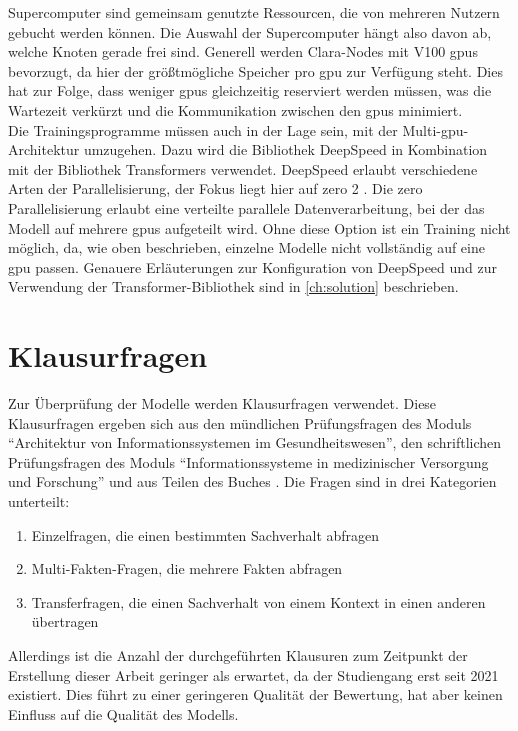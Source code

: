Supercomputer sind gemeinsam genutzte Ressourcen, die von mehreren Nutzern gebucht werden können.
Die Auswahl der Supercomputer hängt also davon ab, welche Knoten gerade frei sind.
Generell werden Clara-Nodes mit V100 \ac{gpu}s bevorzugt, da hier der größtmögliche Speicher pro \ac{gpu} zur Verfügung steht.
Dies hat zur Folge, dass weniger \ac{gpu}s gleichzeitig reserviert werden müssen, was die Wartezeit verkürzt und die Kommunikation zwischen den \ac{gpu}s minimiert.\\

Die Trainingsprogramme müssen auch in der Lage sein, mit der Multi-\ac{gpu}-Architektur umzugehen.
Dazu wird die Bibliothek DeepSpeed \citep{deepspeed} in Kombination mit der Bibliothek Transformers verwendet.
DeepSpeed erlaubt verschiedene Arten der Parallelisierung, der Fokus liegt hier auf \ac{zero} 2 \citep{deepspeed}.
Die \ac{zero} Parallelisierung erlaubt eine verteilte parallele Datenverarbeitung, bei der das Modell auf mehrere \ac{gpu}s aufgeteilt wird.
Ohne diese Option ist ein Training nicht möglich, da, wie oben beschrieben, einzelne Modelle nicht vollständig auf eine \ac{gpu} passen.
Genauere Erläuterungen zur Konfiguration von DeepSpeed und zur Verwendung der Transformer-Bibliothek sind in \cref{ch:solution} beschrieben.

\section{Klausurfragen}\label{sec:approach:questions}
Zur Überprüfung der Modelle werden Klausurfragen verwendet.
Diese Klausurfragen ergeben sich aus den mündlichen Prüfungsfragen des Moduls \enquote{Architektur von Informationssystemen im Gesundheitswesen},
den schriftlichen Prüfungsfragen des Moduls \enquote{Informationssysteme in medizinischer Versorgung und Forschung} und aus Teilen des Buches \citet{bb}.
Die Fragen sind in drei Kategorien unterteilt:
\begin{enumerate}
    \item Einzelfragen, die einen bestimmten Sachverhalt abfragen
    \item Multi-Fakten-Fragen, die mehrere Fakten abfragen
    \item Transferfragen, die einen Sachverhalt von einem Kontext in einen anderen übertragen
\end{enumerate}

Allerdings ist die Anzahl der durchgeführten Klausuren zum Zeitpunkt der Erstellung dieser Arbeit geringer als erwartet, da der Studiengang erst seit 2021 existiert.
Dies führt zu einer geringeren Qualität der Bewertung,
hat aber keinen Einfluss auf die Qualität des Modells.\\


